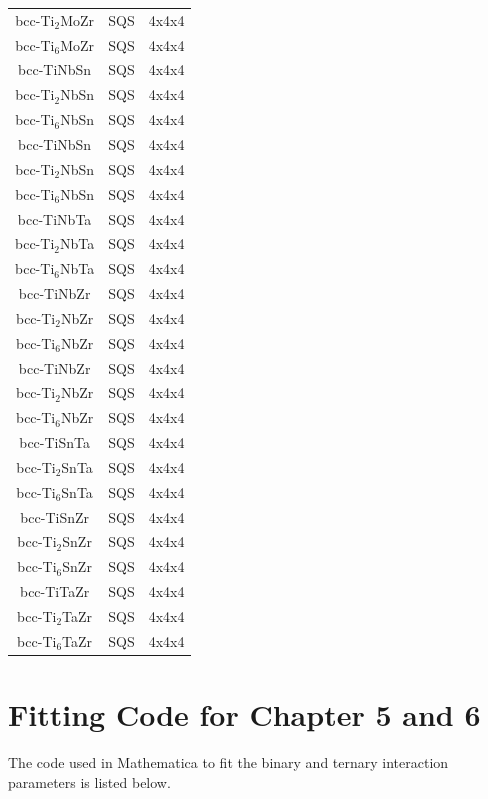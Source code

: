 \begin{longtable}[H]{ c c c }
	bcc-Ti$_{2}$MoZr & SQS & 4x4x4\\
	bcc-Ti$_{6}$MoZr & SQS & 4x4x4\\
	bcc-TiNbSn & SQS & 4x4x4\\
	bcc-Ti$_{2}$NbSn & SQS & 4x4x4\\
	bcc-Ti$_{6}$NbSn & SQS & 4x4x4\\
	bcc-TiNbSn & SQS & 4x4x4\\
	bcc-Ti$_{2}$NbSn & SQS & 4x4x4\\
	bcc-Ti$_{6}$NbSn & SQS & 4x4x4\\
	bcc-TiNbTa & SQS & 4x4x4\\
	bcc-Ti$_{2}$NbTa & SQS & 4x4x4\\
	bcc-Ti$_{6}$NbTa & SQS & 4x4x4\\
	bcc-TiNbZr & SQS & 4x4x4\\
	bcc-Ti$_{2}$NbZr & SQS & 4x4x4\\
	bcc-Ti$_{6}$NbZr & SQS & 4x4x4\\
	bcc-TiNbZr & SQS & 4x4x4\\
	bcc-Ti$_{2}$NbZr & SQS & 4x4x4\\
	bcc-Ti$_{6}$NbZr & SQS & 4x4x4\\
	bcc-TiSnTa & SQS & 4x4x4\\
	bcc-Ti$_{2}$SnTa & SQS & 4x4x4\\
	bcc-Ti$_{6}$SnTa & SQS & 4x4x4\\
	bcc-TiSnZr & SQS & 4x4x4\\
	bcc-Ti$_{2}$SnZr & SQS & 4x4x4\\
	bcc-Ti$_{6}$SnZr & SQS & 4x4x4\\
	bcc-TiTaZr & SQS & 4x4x4\\
	bcc-Ti$_{2}$TaZr & SQS & 4x4x4\\
	bcc-Ti$_{6}$TaZr & SQS & 4x4x4\\
	\hline
\end{longtable}
\clearpage

\section*{Fitting Code for Chapter 5 and 6}
The code used in Mathematica to fit the binary and ternary interaction parameters is listed below.

